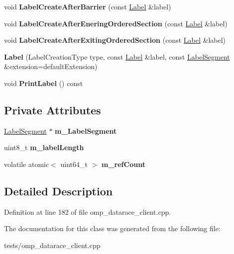 \begin{DoxyCompactItemize}
\item 
\hypertarget{classLabel_a02c946f6049061e9403210f63a291747}{void {\bfseries Label\-Create\-After\-Barrier} (const \hyperlink{classLabel}{Label} \&label)}\label{classLabel_a02c946f6049061e9403210f63a291747}

\item 
\hypertarget{classLabel_a42bdbc380e214b539c5b8db861fd6757}{void {\bfseries Label\-Create\-After\-Enering\-Ordered\-Section} (const \hyperlink{classLabel}{Label} \&label)}\label{classLabel_a42bdbc380e214b539c5b8db861fd6757}

\item 
\hypertarget{classLabel_a28873ccfd689391e0bd46f2a9bd5719e}{void {\bfseries Label\-Create\-After\-Exiting\-Ordered\-Section} (const \hyperlink{classLabel}{Label} \&label)}\label{classLabel_a28873ccfd689391e0bd46f2a9bd5719e}

\item 
\hypertarget{classLabel_a0e238fe9836ba9f4be1af22ee64599ff}{{\bfseries Label} (Label\-Creation\-Type type, const \hyperlink{classLabel}{Label} \&label, const \hyperlink{structLabelSegment}{Label\-Segment} \&extension=default\-Extension)}\label{classLabel_a0e238fe9836ba9f4be1af22ee64599ff}

\item 
\hypertarget{classLabel_aa548453871aa09bb2e6d6244c53054d9}{void {\bfseries Print\-Label} () const }\label{classLabel_aa548453871aa09bb2e6d6244c53054d9}

\end{DoxyCompactItemize}
\subsection*{Private Attributes}
\begin{DoxyCompactItemize}
\item 
\hypertarget{classLabel_a1676b7ea6b1e67e8c0c8ba762c23fec2}{\hyperlink{structLabelSegment}{Label\-Segment} $\ast$ {\bfseries m\-\_\-\-Label\-Segment}}\label{classLabel_a1676b7ea6b1e67e8c0c8ba762c23fec2}

\item 
\hypertarget{classLabel_adaef34df8bbdb59687139262ed25b644}{uint8\-\_\-t {\bfseries m\-\_\-label\-Length}}\label{classLabel_adaef34df8bbdb59687139262ed25b644}

\item 
\hypertarget{classLabel_a9412617cd8470d7d2f4ac32f0530a50f}{volatile atomic$<$ uint64\-\_\-t $>$ {\bfseries m\-\_\-ref\-Count}}\label{classLabel_a9412617cd8470d7d2f4ac32f0530a50f}

\end{DoxyCompactItemize}


\subsection{Detailed Description}


Definition at line 182 of file omp\-\_\-datarace\-\_\-client.\-cpp.



The documentation for this class was generated from the following file\-:\begin{DoxyCompactItemize}
\item 
tests/omp\-\_\-datarace\-\_\-client.\-cpp\end{DoxyCompactItemize}
